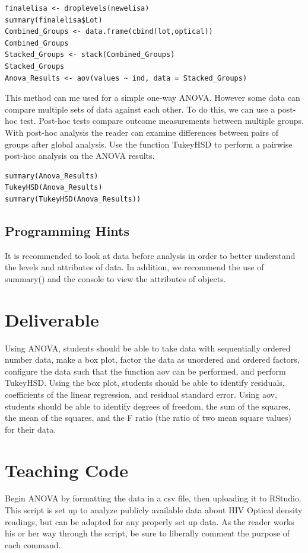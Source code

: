\begin{lstlisting}
finalelisa <- droplevels(newelisa)
summary(finalelisa$Lot)
Combined_Groups <- data.frame(cbind(lot,optical))
Combined_Groups
Stacked_Groups <- stack(Combined_Groups)
Stacked_Groups
Anova_Results <- aov(values ~ ind, data = Stacked_Groups)
\end{lstlisting}
This method can me used for a simple one-way ANOVA. However some data can compare multiple sets of data against each other. To do this, we can use a post-hoc test. Post-hoc tests compare outcome measurements between multiple groups. With post-hoc analysis the reader can examine differences between pairs of groups after global analysis. Use the function TukeyHSD to perform a pairwise post-hoc analysis on the ANOVA results.
\begin{lstlisting}
summary(Anova_Results)
TukeyHSD(Anova_Results)
summary(TukeyHSD(Anova_Results))
\end{lstlisting}
 \subsection{Programming Hints}
It is recommended to look at data before analysis in order to better understand the levels and attributes of data.
In addition, we recommend the use of summary() and the console to view the attributes of objects.
 
\section{Deliverable}

Using ANOVA, students should be able to take data with sequentially ordered number data, make a box plot, factor the data as unordered and ordered factors, configure the data such that the function aov can be performed, and perform TukeyHSD.
Using the box plot, students should be able to identify residuals, coefficients of the linear regression, and residual standard error. 
Using aov, students should be able to identify degrees of freedom, the sum of the squares, the mean of the squares, and the F ratio (the ratio of two mean square values) for their data. 

\section{Teaching Code}

Begin ANOVA by formatting the data in a csv file, then uploading it to RStudio.
This script is set up to analyze publicly available data about HIV Optical density readings, but can be adapted for any properly set up data. As the reader works his or her way through the script, be sure to liberally comment the purpose of each command. 


